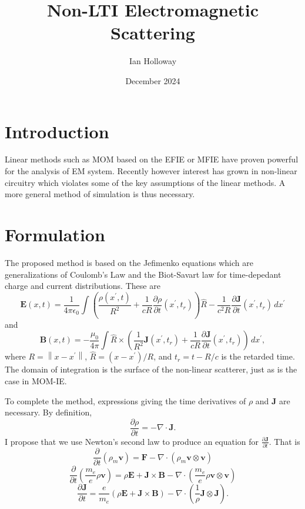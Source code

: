 \documentclass{article}
\title{Non-LTI Electromagnetic Scattering}
\author{Ian Holloway}
\date{December 2024}
\newcommand{\norm}[1]{\left\lVert #1 \right\rVert}
\newcommand{\Div}[0]{\nabla\cdot}
\theoremstyle{plain}
\begin{document}
\maketitle


\section{Introduction}

Linear methods such as MOM based on the EFIE or MFIE have proven powerful for the analysis of EM system.
Recently however interest has grown in non-linear circuitry which violates some of the key assumptions of the linear methods.
A more general method of simulation is thus necessary.


\section{Formulation}

The proposed method is based on the Jefimenko equations
which are generalizations of Coulomb's Law and the Biot-Savart law
for time-depedant charge and current distributions.
These are
\begin{equation}
	\mathbf{E}(x,t) = \frac{1}{4\pi\epsilon_0} \int
	\left( \frac{\rho(x^{'},t)}{R^2}
	+ \frac{1}{cR}\frac{\partial\rho}{\partial t}(x^{'},t_r)
	\right) \hat{R}
	- \frac{1}{c^2R}\frac{\partial\mathbf{J}}{\partial t}(x^{'},t_r)
	\,dx^{'}
\end{equation}
and
\begin{equation}
	\mathbf{B}(x,t) = -\frac{\mu_0}{4\pi} \int
	\hat{R} \times \left(
	\frac{1}{R^2}\mathbf{J}(x^{'},t_r)
	+ \frac{1}{cR}\frac{\partial\mathbf{J}}{\partial t}(x^{'},t_r)
	\right) \,dx^{'},
\end{equation}
where $R=\norm{x-x^{'}}$, $\hat{R} = (x-x^{'})/R$, and $t_r=t-R/c$ is the retarded time.
The domain of integration is the surface of the non-linear scatterer,
just as is the case in MOM-IE.

To complete the method, expressions giving the time derivatives of $\rho$ and $\mathbf{J}$ are necessary.
By definition,
\begin{equation}
	\frac{\partial\rho}{\partial t} = -\Div\mathbf{J}.
\end{equation}
I propose that we use Newton's second law to produce an equation for $\frac{\partial\mathbf{J}}{\partial t}$.
That is
\begin{equation*}
	\frac{\partial}{\partial t}(\rho_m\mathbf{v})
	= \mathbf{F}
	- \Div(\rho_m\mathbf{v}\otimes\mathbf{v})
\end{equation*}
\begin{equation*}
	\frac{\partial}{\partial t}\left( \frac{m_e}{e}\rho\mathbf{v} \right)
	= \rho\mathbf{E} + \mathbf{J}\times\mathbf{B}
	- \Div\left(\frac{m_e}{e}\rho\mathbf{v}\otimes\mathbf{v}\right)
\end{equation*}
\begin{equation}
	\frac{\partial\mathbf{J}}{\partial t}
	= \frac{e}{m_e}\left(
	\rho\mathbf{E} + \mathbf{J}\times\mathbf{B}
	\right)
	- \Div\left(\frac{1}{\rho}\mathbf{J}\otimes\mathbf{J}\right).
\end{equation}
\end{document}
